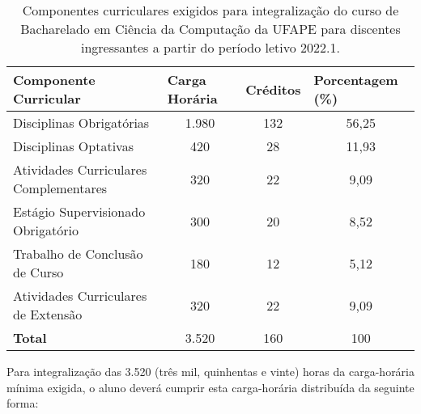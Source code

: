 \documentclass[
	12pt,				%
	openright,			%
  oneside,     %
	a4paper,			%
	english,			%
	french,				%
	spanish,			%
	brazil				%
	]{abntex2}
\begin{document}
\begin{center}
  \begin{small}
  \begin{table}[!htb]
      \caption{\label{quadro:componentes-integralizacao-curso}Componentes curriculares exigidos para integralização do curso de Bacharelado em Ciência da Computação da UFAPE para discentes ingressantes a partir do período letivo 2022.1.}
      \begin{tabular}{p{7.3cm}p{2.3cm}p{1.8cm}p{2.4cm}}
    \toprule
    \textbf{Componente Curricular}         & \textbf{Carga Horária}    & \textbf{Créditos}       & \textbf{Porcentagem (\%)}  \\ \midrule
    Disciplinas Obrigatórias               & \multicolumn{1}{c}{1.980} & \multicolumn{1}{c}{132} &  \multicolumn{1}{c}{56,25} \\ \midrule
    Disciplinas Optativas                  & \multicolumn{1}{c}{420}   & \multicolumn{1}{c}{28}  &  \multicolumn{1}{c}{11,93} \\ \midrule
    Atividades Curriculares Complementares & \multicolumn{1}{c}{320}   & \multicolumn{1}{c}{22}  &   \multicolumn{1}{c}{9,09} \\ \midrule
    Estágio Supervisionado Obrigatório     & \multicolumn{1}{c}{300}   & \multicolumn{1}{c}{20}  &   \multicolumn{1}{c}{8,52} \\ \midrule
    Trabalho de Conclusão de Curso         & \multicolumn{1}{c}{180}   & \multicolumn{1}{c}{12}  &   \multicolumn{1}{c}{5,12} \\ \midrule
    Atividades Curriculares de Extensão    & \multicolumn{1}{c}{320}   & \multicolumn{1}{c}{22}  &   \multicolumn{1}{c}{9,09} \\ \midrule
    \textbf{Total}                         & \multicolumn{1}{c}{3.520} & \multicolumn{1}{c}{160} & \multicolumn{1}{c}{100}    \\ \bottomrule
    \end{tabular}
  \end{table}
  \end{small}
  \end{center}

Para integralização das 3.520 (três mil, quinhentas e vinte) horas da carga-horária mínima exigida, o aluno deverá cumprir esta carga-horária distribuída da seguinte forma: 
\end{document}
